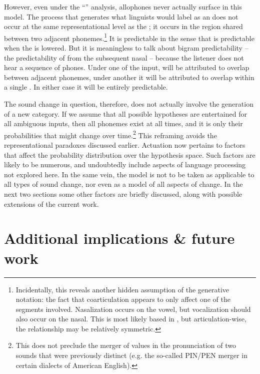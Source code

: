 However, even under the “” analysis, allophones never
actually surface in this model. The process that generates what linguists
would label as an  does not occur at the same representational
level as the ; it occurs in the region shared between two adjacent
phonemes.\footnote{Incidentally, this reveals another hidden assumption of the generative
notation: the fact that coarticulation appears to only affect one
of the segments involved. Nasalization occurs on the vowel, but vocalization
should also occur on the nasal. This  is most likely based in
, but articulation-wise, the  relationship may
be relatively symmetric.} It is predictable in the sense that  is predictable when
the  is lowered. But it is meaningless to talk about bigram predictability
– the predictability of  from the subsequent nasal –
because the listener does not hear a sequence of phones. Under one
 of the input,  will be attributed to 
overlap between adjacent phonemes, under another it will be attributed
to  overlap within a single . In either case it will
be entirely predictable. 

The sound change in question, therefore, does not actually involve
the generation of a new  category. If we assume that all possible
hypotheses are entertained for all ambiguous inputs, then all phonemes
exist at all times, and it is only their probabilities that might
change over time.\footnote{This does not preclude the merger of  values in the pronunciation
of two sounds that were previously distinct (e.g. the so-called PIN/PEN
merger in certain dialects of American English).} This reframing avoids the representational paradoxes discussed
earlier. Actuation now pertains to factors that affect the probability
distribution over the hypothesis space. Such factors are likely to
be numerous, and undoubtedly include aspects of language processing
not explored here. In the same vein, the  model
is not to be taken as applicable to all types of sound change, nor
even as a model of all aspects of  change. In
the next two sections some other factors are briefly discussed, along
with possible extensions of the current work.

\section{Additional implications \& future work}

